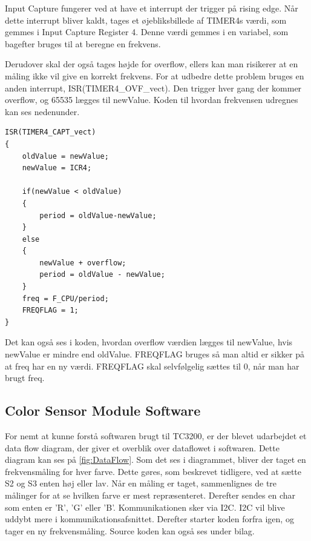 Input Capture \cite{man:mega2560} fungerer ved at have et interrupt der trigger på rising edge. Når dette interrupt bliver kaldt, tages et øjebliksbillede af TIMER4s værdi, som gemmes i Input Capture Register 4. Denne værdi gemmes i en variabel, som bagefter bruges til at beregne en frekvens. 

Derudover skal der også tages højde for overflow, ellers kan man risikerer at en måling ikke vil give en korrekt frekvens. For at udbedre dette problem bruges en anden interrupt, ISR(TIMER4\_OVF\_vect). Den trigger hver gang der kommer overflow, og 65535 lægges til newValue. Koden til hvordan frekvensen udregnes kan ses nedenunder.

\newpage
\begin{lstlisting}
ISR(TIMER4_CAPT_vect)
{
	oldValue = newValue;
	newValue = ICR4;
	
	if(newValue < oldValue)
	{
		period = oldValue-newValue;
	}
	else
	{
		newValue + overflow;
		period = oldValue - newValue;
	}
	freq = F_CPU/period;
	FREQFLAG = 1;
}

\end{lstlisting}

Det kan også ses i koden, hvordan overflow værdien lægges til newValue, hvis newValue er mindre end oldValue. FREQFLAG bruges så man altid er sikker på at freq har en ny værdi. FREQFLAG skal selvfølgelig sættes til 0, når man har brugt freq.

\subsection{Color Sensor Module Software}
For nemt at kunne forstå softwaren brugt til TC3200, er der blevet udarbejdet et data flow diagram, der giver et overblik over dataflowet i softwaren. Dette diagram kan ses på \autoref{fig:DataFlow}. Som det ses i diagrammet, bliver der taget en frekvensmåling for hver farve. Dette gøres, som beskrevet tidligere, ved at sætte S2 og S3 enten høj eller lav. Når en måling er taget, sammenlignes de tre målinger for at se hvilken farve er mest repræsenteret. Derefter sendes en char som enten er 'R', 'G' eller 'B'. Kommunikationen sker via I2C. I2C vil blive uddybt mere i kommunikationsafsnittet. Derefter starter koden forfra igen, og tager en ny frekvensmåling. Source koden kan også ses under bilag.

